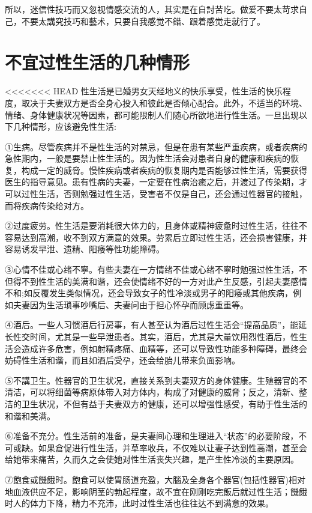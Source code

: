 \documentclass[12pt,UTF8]{ctexbook}
\begin{document}
所以，迷信性技巧而又忽视情感交流的人，其实是在自討苦吃。做爱不要太苛求自己，不要太講究技巧和藝术，只要自我感觉不錯、跟着感觉走就行了。

\section{不宜过性生活的几种情形}

<<<<<<< HEAD
性生活是已婚男女天经地义的快乐享受，性生活的快乐程度，取决于夫妻双方是否全身心投入和彼此是否倾心配合。此外，不适当的环境、情绪、身体健康状况等因素，都可能限制人们随心所欲地进行性生活。一旦出现以下几种情形，应该避免性生活:

①生病。尽管疾病并不是性生活的对禁忌，但是在患有某些严重疾病，或者疾病的急性期内，一般是要禁止性生活的。因为性生活会对患者自身的健康和疾病的恢复，构成一定的威脅。慢性疾病或者疾病的恢复期内是否能够过性生活，需要获得医生的指导意见。患有性病的夫妻，一定要在性病治癒之后，并渡过了传染期，才可以过性生活，否则勉强过性生活，受害者不仅是自己，还会通过性器官的接触，而将疾病传染给对方。

②过度疲劳。性生活是要消耗很大体力的，且身体或精神疲惫时过性生活，往往不容易达到高潮，收不到双方满意的效果。劳累后立即过性生活，还会损害健康，并容易诱发早泄、遗精、阳痿等性功能障碍。

③心情不佳或心绪不寧。有些夫妻在一方情绪不佳或心绪不寧时勉强过性生活，不但得不到性生活的美满和谐，还会使情绪不好的一方对此产生反感，引起夫妻感情不和;如反覆发生类似情况，还会导致女子的性冷淡或男子的阳痿或其他疾病，例如夫妻因为生活琐事吵嘴后、夫妻问由于担心怀孕而顾虑重重等。

④酒后。一些人习惯酒后行房事，有人甚至认为酒后过性生活会“提高品质”，能延长性交时间，尤其是一些早泄患者。其实，酒后，尤其是大量饮用烈性酒后，性生活会造成许多危害，例如射精疼痛、血精等，还可以导致性功能多种障碍，最终会妨碍性生活和谐，而且如酒后受孕，还会给胎儿带来负面影响。

⑤不講卫生。性器官的卫生状况，直接关系到夫妻双方的身体健康。生殖器官的不清洁，可以将细菌等病原体带入对方体内，构成了对健康的威脅；反之，清新、整洁的卫生状况，不但有益于夫妻双方的健康，还可以增强性感受，有助于性生活的和谐和美满。

⑥准备不充分。性生活前的准备，是夫妻间心理和生理进入“状态”的必要阶段，不可或缺。如果倉促进行性生活，并草率收兵，不仅难以让妻子达到性高潮，甚至会给她带来痛苦，久而久之会使她对性生活丧失兴趣，是产生性冷淡的主要原因。

⑦飽食或饑餓时。飽食可以使胃肠道充盈，大腦及全身各个器官(包括性器官)相对地血液供应不足，影响阴茎的勃起程度，故不宜在刚刚吃完飯后就过性生活；饑餓时人的体力下降，精力不充沛，此时过性生活也往往达不到满意的效果。
\end{document}
